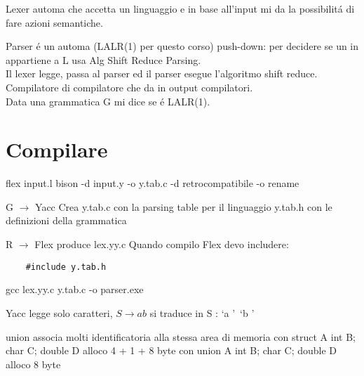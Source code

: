 
Lexer automa che accetta un linguaggio e in base all'input mi da la possibilit\'a di fare azioni semantiche.

Parser \'e un automa (LALR(1) per questo corso) push-down: per decidere se un in appartiene a L usa Alg Shift Reduce Parsing.\\
	
Il lexer legge, passa al parser ed il parser esegue l'algoritmo shift reduce.\\

Compilatore di compilatore che da in output compilatori.\\

Data una grammatica G mi dice se \'e LALR(1).

\section{Compilare}
flex input.l
bison -d input.y -o y.tab.c
	-d retrocompatibile 
	-o rename

G $\rightarrow$ Yacc Crea
	y.tab.c con la parsing table per il linguaggio
	y.tab.h con le definizioni della grammatica

R $\rightarrow$ Flex produce lex.yy.c
Quando compilo Flex devo includere:

\begin{lstlisting}
	#include y.tab.h
\end{lstlisting}

gcc lex.yy.c y.tab.c -o parser.exe

Yacc legge solo caratteri, $S \rightarrow ab$ si traduce in S : \lq a \rq\ \lq b \rq

union associa molti identificatoria alla stessa area di memoria
con struct A{ int B; char C; double D} alloco 4 + 1 + 8 byte
con union A{ int B; char C; double D} alloco 8 byte

